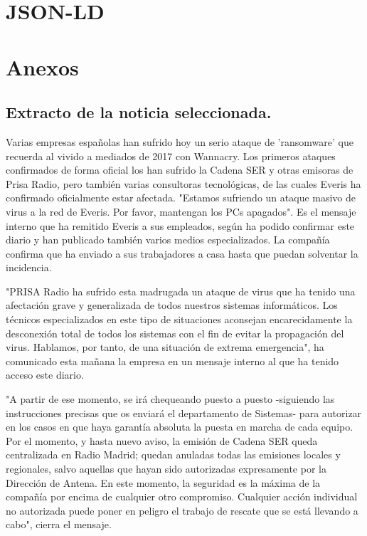 \documentclass{llncs}   %
\begin{document}
\section{JSON-LD}

\section{Anexos}
\subsection{Extracto de la noticia seleccionada.}\label{noticia}
Varias empresas españolas han sufrido hoy un serio ataque de 'ransomware' que recuerda al 
vivido a mediados de 2017 con Wannacry. Los primeros ataques confirmados de forma oficial 
los han sufrido la Cadena SER y otras emisoras de Prisa Radio, pero también varias consultoras 
tecnológicas, de las cuales Everis ha confirmado oficialmente estar afectada. "Estamos sufriendo 
un ataque masivo de virus a la red de Everis. Por favor, mantengan los PCs apagados". Es el 
mensaje interno que ha remitido Everis a sus empleados, según ha podido confirmar este diario 
y han publicado también varios medios especializados. La compañía confirma que ha enviado a sus 
trabajadores a casa hasta que puedan solventar la incidencia.

"PRISA Radio ha sufrido esta madrugada un ataque de virus que ha tenido una afectación grave y 
generalizada de todos nuestros sistemas informáticos. Los técnicos especializados en este tipo 
de situaciones aconsejan encarecidamente la desconexión total de todos los sistemas con el fin 
de evitar la propagación del virus. Hablamos, por tanto, de una situación de extrema emergencia", 
ha comunicado esta mañana la empresa en un mensaje interno al que ha tenido acceso este diario.

"A partir de ese momento, se irá chequeando puesto a puesto -siguiendo las instrucciones precisas 
que os enviará el departamento de Sistemas- para autorizar en los casos en que haya garantía 
absoluta la puesta en marcha de cada equipo. Por el momento, y hasta nuevo aviso, la emisión de 
Cadena SER queda centralizada en Radio Madrid; quedan anuladas todas las emisiones locales y 
regionales, salvo aquellas que hayan sido autorizadas expresamente por la Dirección de Antena. 
En este momento, la seguridad es la máxima de la compañía por encima de cualquier otro compromiso. 
Cualquier acción individual no autorizada puede poner en peligro el trabajo de rescate que se está 
llevando a cabo", cierra el mensaje.
\end{document}
